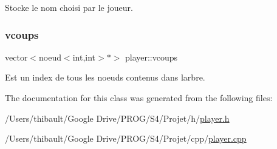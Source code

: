 Stocke le nom choisi par le joueur. 

\mbox{\label{classplayer_a577febe1e35c769385c8c7287df15939}} 
\subsubsection{\texorpdfstring{vcoups}{vcoups}}
{\footnotesize\ttfamily vector$<$noeud$<$int,int$>$$\ast$$>$ player\+::vcoups\hspace{0.3cm}{\ttfamily [private]}}



Est un index de tous les noeuds contenus dans l\textquotesingle{}arbre. 



The documentation for this class was generated from the following files\+:\begin{DoxyCompactItemize}
\item 
/\+Users/thibault/\+Google Drive/\+P\+R\+O\+G/\+S4/\+Projet/h/\hyperlink{player_8h}{player.\+h}\item 
/\+Users/thibault/\+Google Drive/\+P\+R\+O\+G/\+S4/\+Projet/cpp/\hyperlink{player_8cpp}{player.\+cpp}\end{DoxyCompactItemize}
